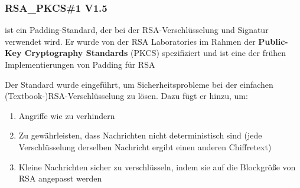 \subsubsection*{RSA\_PKCS\#1 V1.5}
\begin{infoBox}[title=RSA PKCS\#1 v1.5]
     ist ein Padding-Standard, der bei der RSA-Verschlüsselung und Signatur verwendet wird. Er wurde von der RSA Laboratories im Rahmen der \textbf{Public-Key Cryptography Standards} (PKCS) spezifiziert und ist eine der frühen Implementierungen von Padding für RSA
\end{infoBox}
\begin{infoBox}[title=Zweck von PKCS\#1 v1.5]
    Der Standard wurde eingeführt, um Sicherheitsprobleme bei der einfachen (Textbook-)RSA-Verschlüsselung zu lösen. Dazu fügt er  hinzu, um:
    \begin{enumerate}
        \item Angriffe wie  zu verhindern
        \item Zu gewährleisten, dass Nachrichten nicht deterministisch sind (jede Verschlüsselung derselben Nachricht ergibt einen anderen Chiffretext)
        \item Kleine Nachrichten sicher zu verschlüsseln, indem sie auf die Blockgröße von RSA angepasst werden
    \end{enumerate}
\end{infoBox}
